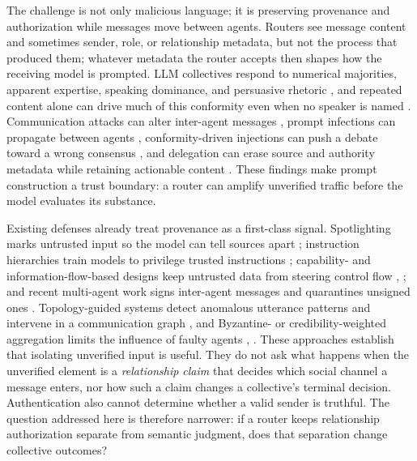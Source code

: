 \documentclass[11pt]{article}
\begin{document}
The challenge is not only malicious language; it is preserving provenance and authorization while messages move between agents. Routers see message content and sometimes sender, role, or relationship metadata, but not the process that produced them; whatever metadata the router accepts then shapes how the receiving model is prompted. LLM collectives respond to numerical majorities, apparent expertise, speaking dominance, and persuasive rhetoric \cite{chuang2024opinion,choi2025conformity,ashery2025conventions,zomer2026collective,ko2026social,oh2026belief,amayuelas2024attack,kraidia2026persuasion}, and repeated content alone can drive much of this conformity even when no speaker is named \cite{hu2026speaker}. Communication attacks can alter inter-agent messages \cite{he2025redteaming}, prompt infections can propagate between agents \cite{lee2024promptinfection}, conformity-driven injections can push a debate toward a wrong consensus \cite{cui2025madspear}, and delegation can erase source and authority metadata while retaining actionable content \cite{zhou2026trustcascade}. These findings make prompt construction a trust boundary: a router can amplify unverified traffic before the model evaluates its substance.

Existing defenses already treat provenance as a first-class signal. Spotlighting marks untrusted input so the model can tell sources apart \cite{hines2024spotlighting}; instruction hierarchies train models to privilege trusted instructions \cite{wallace2024hierarchy}; capability- and information-flow-based designs keep untrusted data from steering control flow \cite{debenedetti2025camel}, \cite{costa2025fides}; and recent multi-agent work signs inter-agent messages and quarantines unsigned ones \cite{paul2026beyond}. Topology-guided systems detect anomalous utterance patterns and intervene in a communication graph \cite{wang2025gsafeguard}, and Byzantine- or credibility-weighted aggregation limits the influence of faulty agents \cite{zheng2025byzantine}, \cite{ebrahimi2025credibility}. These approaches establish that isolating unverified input is useful. They do not ask what happens when the unverified element is a \textit{relationship claim} that decides which social channel a message enters, nor how such a claim changes a collective's terminal decision. Authentication also cannot determine whether a valid sender is truthful. The question addressed here is therefore narrower: if a router keeps relationship authorization separate from semantic judgment, does that separation change collective outcomes?
\end{document}
